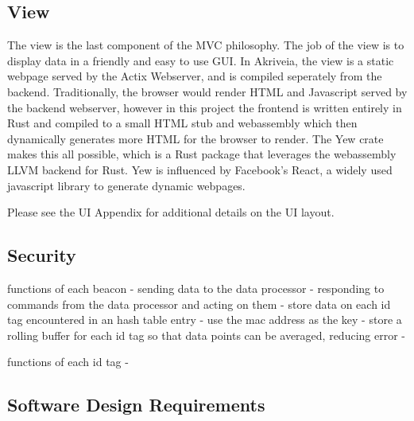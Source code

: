 \subsection{View}
The view is the last component of the MVC philosophy.
The job of the view is to display data in a friendly and easy to use GUI.
In Akriveia, the view is a static webpage served by the Actix Webserver, and is compiled seperately from the backend.
Traditionally, the browser would render HTML and Javascript served by the backend webserver, however in this project the frontend is written entirely in Rust and compiled to a small HTML stub and webassembly which then dynamically generates more HTML for the browser to render.
The Yew crate makes this all possible, which is a Rust package that leverages the webassembly LLVM backend for Rust.
Yew is influenced by Facebook's React, a widely used javascript library to generate dynamic webpages.


\bigskip
Please see the UI Appendix for additional details on the UI layout.

\subsection{Security}


\bigskip

functions of each beacon
	- sending data to the data processor
	- responding to commands from the data processor and acting on them
	- store data on each id tag encountered in an hash table entry - use the mac address as the key
	- store a rolling buffer for each id tag so that data points can be averaged, reducing error
	-

\bigskip

functions of each id tag
	-




\pagebreak
\subsection{Software Design Requirements}

